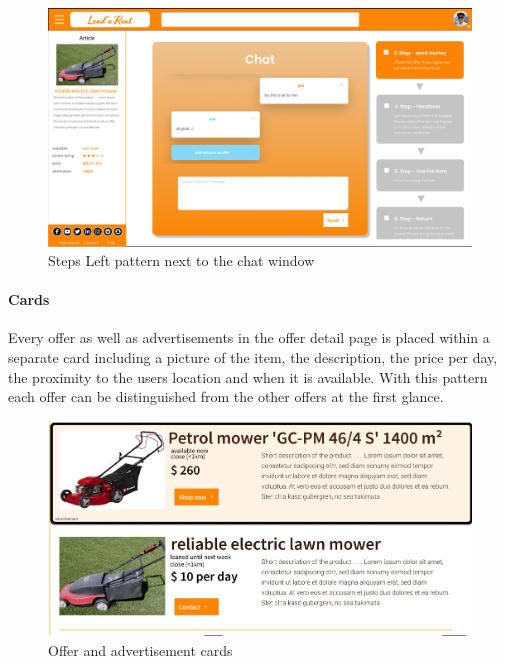 		\begin{figure}[H]
			\centering
			\includegraphics[width=\linewidth]{abb/3_design_guidelines/stepsleft.png}
			\caption{Steps Left pattern next to the chat window}
			\label{fig:stepsleft}
		\end{figure}
	\par
	
	\paragraph{Cards}
		Every offer as well as advertisements in the offer detail page is placed within a separate card including a picture of the item, the description, the price per day, the proximity to the users location and when it is available. With this pattern each offer can be distinguished from the other offers at the first glance.
		
		\begin{figure}[H]
			\centering
			\includegraphics[width=\linewidth]{abb/3_design_guidelines/cards.png}
			\caption{Offer and advertisement cards}
			\label{fig:cards}
		\end{figure}
	\par
	
